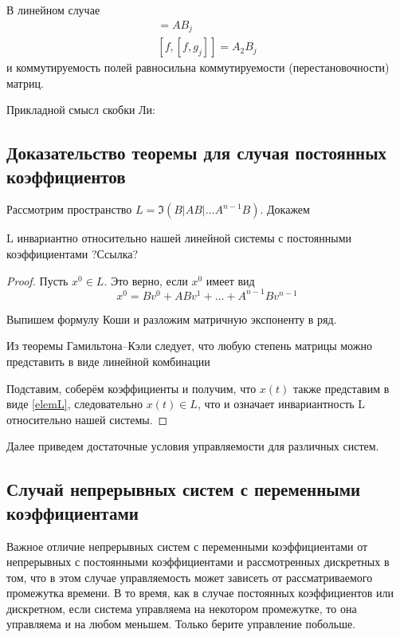 {\begin{df}
\end{df}

В линейном случае
\begin{gather*}
	[f, g_j] = AB_j \\
	[f, [f, g_j]] = A_2 B_j
\end{gather*}
и коммутируемость полей равносильна коммутируемости (перестановочности) матриц.

Прикладной смысл скобки Ли:


\subsection{Доказательство теоремы для случая постоянных коэффициентов}
Рассмотрим пространство $L = \Im (B|AB| \ldots A^{n-1}B)$. Докажем

\begin{lemma}
	L инвариантно относительно нашей линейной системы с постоянными коэффициентами ?Ссылка?
\end{lemma}
\begin{proof}
	Пусть $x^0 \in L$. Это верно, если $x^0$ имеет вид
	\begin{equation}
		x^0 = B v^0 + AB v^1 + \ldots + A^{n-1} B v^{n-1} \label{elemL}
	\end{equation}

	Выпишем формулу Коши и разложим матричную экспоненту в ряд.
	
	Из теоремы Гамильтона--Кэли следует, что любую степень матрицы можно представить в виде линейной комбинации
	
	Подставим, соберём коэффициенты и получим, что $x(t)$ также представим в виде \eqref{elemL}, следовательно $x(t) \in L$, что и означает инвариантность L относительно нашей системы.
\end{proof}

Далее приведем достаточные условия управляемости для различных систем.

\subsection{Случай непрерывных систем с переменными коэффициентами}
Важное отличие непрерывных систем с переменными коэффициентами от непрерывных с постоянными коэффициентами и рассмотренных дискретных в том, что в этом случае управляемость может зависеть от рассматриваемого промежутка времени. В то время, как в случае постоянных коэффициентов или дискретном, если система управляема на некотором промежутке, то она управляема и на любом меньшем. Только берите управление побольше.

}
